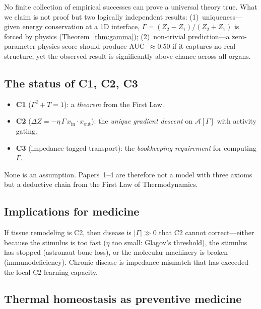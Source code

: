 \documentclass[aps,pre,twocolumn,superscriptaddress,floatfix]{revtex4-2}
\begin{document}
No finite collection of empirical successes can prove a
universal theory true.
What we claim is not proof but two logically independent
results: (1)~uniqueness---given energy conservation at a
1D interface, $\Gamma = (Z_2-Z_1)/(Z_2+Z_1)$ is forced
by physics (Theorem~\ref{thm:gamma}); (2)~non-trivial
prediction---a zero-parameter physics score should produce
AUC~$\approx 0.50$ if it captures no real structure, yet
the observed result is significantly above chance across
all organs.

\subsection{The status of C1, C2, C3}

\begin{itemize}
  \item \textbf{C1} ($\Gamma^2 + T = 1$): a \emph{theorem}
    from the First Law.
  \item \textbf{C2} ($\Delta Z = -\eta\,\Gamma\,x_{\text{in}}
    \cdot x_{\text{out}}$): the \emph{unique gradient descent}
    on $\mathcal{A}[\Gamma]$ with activity gating.
  \item \textbf{C3} (impedance-tagged transport):
    the \emph{bookkeeping requirement} for computing $\Gamma$.
\end{itemize}
None is an assumption.  Papers~1--4 are therefore not a
model with three axioms but a deductive chain from the
First Law of Thermodynamics.

\subsection{Implications for medicine}

If tissue remodeling is C2, then disease is
$|\Gamma| \gg 0$ that C2 cannot correct---either because
the stimulus is too fast ($\eta$ too small: Glagov's
threshold), the stimulus has stopped (astronaut bone loss),
or the molecular machinery is broken (immunodeficiency).
Chronic disease is impedance mismatch that has exceeded
the local C2 learning capacity.

\subsection{Thermal homeostasis as preventive medicine}
\end{document}
